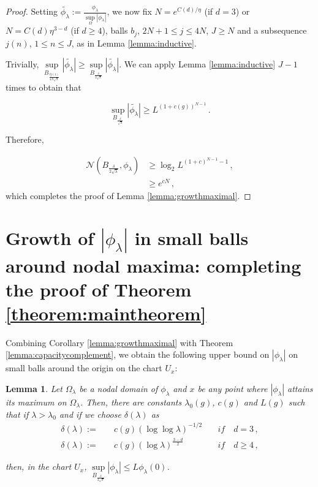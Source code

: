 \documentclass{amsart}
\newtheorem{lemma}[theorem]{Lemma}
\begin{document}
\begin{proof}
Setting $\widetilde{\phi_\lambda} := \frac{\phi_\lambda}{ \sup\limits_\Omega|\phi_{\lambda}|}$, we now fix $N = e^{C(d)/\eta}$ (if $d=3$) or $N= C(d) \eta^{3-d}$ (if $d \geq 4$), balls $b_j$, $2N+1 \leq j \leq 4N$, $J \geq N$ and a subsequence $j(n)$, $1 \leq n \leq J$, as in Lemma \ref{lemma:inductive}.

Trivially, $\sup\limits_{B_{\frac{\delta j(1)}{4N \sqrt{\lambda}}}} |\widetilde{\phi_\lambda}| \geq \sup\limits_{B_{\frac{\delta}{2\sqrt{\lambda}}}} |\widetilde{\phi_\lambda}|$. We can apply Lemma \ref{lemma:inductive} $J-1$ times to obtain that 

\begin{equation}
    \sup\limits_{B_{\frac{\delta}{\sqrt{\lambda}}}} |\widetilde{\phi_\lambda}| \geq L^{(1+c(g))^{N-1}}  \, .
\end{equation}

Therefore, 

\begin{align}\label{eq:lowerbounddoubling}
    \mathcal{N}(B_{\frac{\delta}{2\sqrt{\lambda}}},\phi_{\lambda}) &\geq \log_2 L^{{(1+c)}^{N-1}-1}\, ,\\
    &\geq e^{cN} \, ,
\end{align}
which completes the proof of Lemma \ref{lemma:growthmaximal}.
\end{proof}

\section{Growth of $|\phi_\lambda|$ in small balls around nodal maxima: completing the proof of Theorem \ref{theorem:maintheorem}}


Combining Corollary \ref{lemma:growthmaximal} with Theorem \ref{lemma:capacitycomplement}, we obtain the following upper bound on $|\phi_\lambda|$ on small balls around the origin on the chart $U_x$:

\begin{lemma}\label{lemma:estimatearoundmaximum}
Let $\Omega_\lambda$ be a nodal domain of $\phi_\lambda$ and $x$ be any point where $|\phi_\lambda|$ attains its maximum on $\Omega_\lambda$. Then, there are constants $\lambda_0(g)$, $c(g)$ and $L(g)$ such that if $\lambda > \lambda_0$ and if we choose $\delta(\lambda)$ as
\begin{align}
    \delta(\lambda):= \quad &c(g)(\log\log\lambda)^{-1/2}  \quad & if \quad d=3 \, ,\\
    \delta(\lambda):= \quad &c(g)(\log\lambda)^{\frac{3-d}{2}} \quad & if \quad d \geq 4 \, ,
\end{align}

then, in the chart $U_x$, $\sup\limits_{B_{\frac{\delta}{2 \sqrt{\lambda}}}}|\phi_\lambda| \leq L \phi_\lambda (0)$.

\end{lemma}
\end{document}
